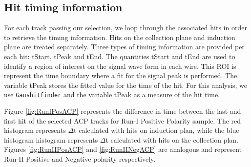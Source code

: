 \subsection{Hit timing information}\label{sec:HitTime}
For each track passing our selection, we loop through the associated hits in order to retrieve the timing information. Hits on the collection plane and induction plane are treated separately. Three types of timing information are provided per each hit: tStart, tPeak and tEnd. The quantities tStart and tEnd are used to identify a region of interest on the signal wave form in each wire. This ROI is represent the time boundary where a fit for the signal peak is performed. The variable tPeak stores the fitted value for the time of the hit. For this analysis, we use \verb!Gaushitfinder! and the variable tPeak as a measure of the hit time.


Figure \ref{fig:RunIPosACP} represents the difference in time between the last and first hit of the selected ACP tracks for Run-I Positive Polarity sample. The red histogram represents $\Delta$t calculated with hits on induction plan, while the blue histogram histogram represents $\Delta$t calculated with hits on the collection plan. Figures \ref{fig:RunIIPosACP} and \ref{fig:RunIINegACP} are analogous and represent Run-II Positive and Negative polarity respectively.


